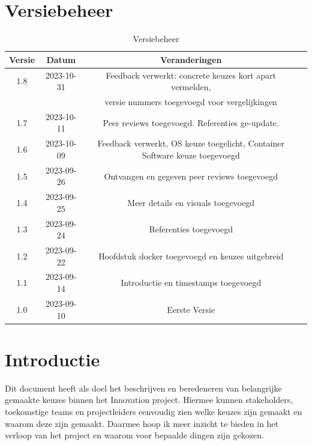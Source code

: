 \documentclass[a4paper]{report}
\newcommand{\latestVersion}{1.8}
\begin{document}
\tableofcontents

\chapter{Versiebeheer}
\begin{table}[h]
    \centering
    \begin{tabular}{|c|c|c|p{5cm}|}
        \hline
        \textbf{Versie} & \textbf{Datum} & \textbf{Veranderingen}  \\
        \hline
        \latestVersion   & 2023-10-31 & Feedback verwerkt: concrete keuzes kort apart vermelden, \\  & & versie nummers toegevoegd voor vergelijkingen \\
        \hline
        1.7   & 2023-10-11 & Peer reviews toegevoegd. Referenties ge-update. \\
        \hline
        1.6    & 2023-10-09 & Feedback verwerkt, OS keuze toegelicht, Container Software keuze toegevoegd \\
        \hline
        1.5    & 2023-09-26 & Ontvangen en gegeven peer reviews toegevoegd \\
        \hline
        1.4    & 2023-09-25 & Meer details en visuals toegevoegd \\
        \hline
        1.3    & 2023-09-24 & Referenties toegevoegd \\
        \hline
        1.2    & 2023-09-22 & Hoofdstuk docker toegevoegd en keuzes uitgebreid \\
        \hline
        1.1    & 2023-09-14 & Introductie en timestamps toegevoegd\\
        \hline
        1.0    & 2023-09-10 & Eerste Versie \\
        \hline
    \end{tabular}
    \caption{Versiebeheer}
\end{table}


\chapter{Introductie}
Dit document heeft als doel het beschrijven en beredeneren van belangrijke gemaakte keuzes binnen het Innovation project. 
Hiermee kunnen stakeholders, toekomstige teams en projectleiders eenvoudig zien welke keuzes zijn gemaakt en waarom deze zijn gemaakt.
Daarmee hoop ik meer inzicht te bieden in het verloop van het project en waarom voor bepaalde dingen zijn gekozen. 
\vspace{1.5cm}
\end{document}
